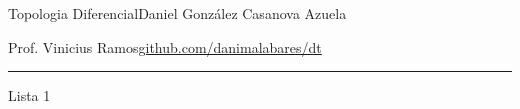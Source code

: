 
%




\begin{minipage}{\textwidth}
	\begin{minipage}{1\textwidth}
		Topologia Diferencial\hfill Daniel González Casanova Azuela
		
		{Prof. Vinicius Ramos\hfill\href{https://github.com/danimalabares/dt}{github.com/danimalabares/dt}}
	\end{minipage}
\end{minipage}\vspace{.2cm}\hrule

\vspace{10pt}
{\huge Lista 1}

